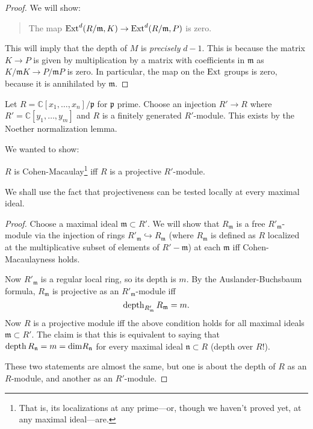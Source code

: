 \begin{proof}
We will show:
\begin{quote}
The map $\operatorname{Ext}^d(R/\mathfrak{m}, K) \to \operatorname{Ext}^{d}(R/\mathfrak{m},
P)$ is zero.
\end{quote}
This will imply that the depth of $M$ is \emph{precisely} $d-1$.
This is because the matrix $K \to P$ is given by multiplication
by a matrix
with coefficients in $\mathfrak{m}$ as $K/\mathfrak{m}K \to
P/\mathfrak{m}P$
is zero. In particular, the map on the $\operatorname{Ext}$ groups is zero,
because it is
annihilated by $\mathfrak{m}$.
\end{proof}

\begin{example}
Let $R = \mathbb{C}[x_1, \dots, x_n]/\mathfrak{p}$ for
$\mathfrak{p}$ prime.
Choose an injection $R' \to R$ where $R' = \mathbb{C}[y_1,
\dots, y_m]$ and
$R$ is a finitely generated $R'$-module. This exists by the Noether
normalization lemma.

We wanted to show:

\begin{theorem}
$R$ is Cohen-Macaulay\footnote{That is, its localizations at any
prime---or,
though we haven't proved yet, at any maximal ideal---are.} iff
$R$ is a
projective $R'$-module.
\end{theorem}

We shall use the fact that projectiveness can be tested locally
at every
maximal ideal.

\begin{proof}
Choose a maximal ideal $\mathfrak{m} \subset R'$. We will show
that
$R_{\mathfrak{m}}$ is a free $R'_{\mathfrak{m}}$-module via the
injection of
rings $R'_{\mathfrak{m}} \hookrightarrow R_{\mathfrak{m}}$
(where
$R_{\mathfrak{m}}$ is defined as $R$ localized at the
multiplicative subset
of elements of $R' - \mathfrak{m}$) at each $\mathfrak{m}$ iff
Cohen-Macaulayness holds.

Now $R'_{\mathfrak{m}}$ is a regular local ring, so its depth is
$m$. By the
Auslander-Buchsbaum formula, $R_{\mathfrak{m}}$ is projective as
an
$R'_{\mathfrak{m}}$-module iff
\[ \operatorname{depth}_{R'_{\mathfrak{m}}} R_{\mathfrak{m}} = m.  \]
Now $R$ is a projective module iff the above condition holds for
all maximal
ideals $\mathfrak{m} \subset R'$. The claim is that this is
equivalent to
saying that $\operatorname{depth} R_{\mathfrak{n}} = m = \mathrm{dim}
R_{\mathfrak{n}}$
for every maximal ideal $\mathfrak{n} \subset R$ (depth over
$R$!).

These two statements are almost the same, but one is about the
depth of $R$ as
an $R$-module, and another as an $R'$-module.


\end{proof}
\end{example}
